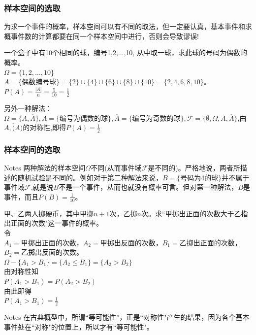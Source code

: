 \begin{frame}
\frametitle{样本空间的选取}
为求一个事件的概率，样本空间可以有不同的取法，但一定要认真，基本事件和求概事件数的计算都要在同一个样本空间中进行，否则会导致谬误!
\begin{example}
	一个盒子中有10个相同的球，编号1,2,...,10, 从中取一球，求此球的号码为偶数的概率。\\
	$\Omega=\{1,2,\dots,10\}$\\
	$A=\{\text{偶数编号球} \}=\{2\}\cup\{4\}\cup\{6\}\cup\{8\}\cup\{10\}=\{2,4,6,8,10\}$。\\
	$P(A)=\frac{|A|}{n}=\frac{5}{10}=\frac{1}{2}$
\end{example}
另外一种解法：$\Omega=\{A,\overline{A}\},A=\{\text{编号为偶数的球}\},\overline{A}=\{\text{编号为奇数的球}\},\mathcal{F}=\{\emptyset,\Omega,A,\overline{A}\}$,由$A,\overline(A)$的对称性,即得$P(A)=\frac{1}{2}$

\end{frame}

\begin{frame}
\frametitle{样本空间的选取}
\begin{block}{Notes}
	两种解法的样本空间$\Omega$不同(从而事件域$\mathcal{F}$是不同的)。严格地说，两者所描述的随机试验是不同的。例如对于第二种解法来说，$B=\{\text{号码为4的球}\}$并不属于事件域$\mathcal{F}$,就是说$B$不是一个事件，从而也就没有概率可言。但对第一种解法，$B$是事件，而且$P(B)=\frac{1}{10}$。
\end{block}

\end{frame}

\begin{frame}
\begin{example}
	甲、乙两人掷硬币，其中甲掷$n+1$次，乙掷$n$次。求``甲掷出正面的次数大于乙指出正面的次数"这一事件的概率。\\
	令\\ $A_1=$甲掷出正面的次数，$A_2=$甲掷出反面的次数，$B_1=$乙掷出正面的次数，$B_2=$乙掷出反面的次数。\\
	$\Omega-\{A_1 > B_1\}=\{A_2\le B_1\}=\{A_2>B_2\}$\\
	由对称性知\\
	$P(A_1>B_1)=P(A_2>B_2)$\\
	由此即得\\
	$P(A_1>B_1)=\frac{1}{2}$
\end{example}
\begin{block}{Notes}
	在古典概型中，所谓``等可能性''，正是``对称性"产生的结果，因为各个基本事件处在``对称"的位置上，所以才有``等可能性"。
\end{block}
\end{frame}

